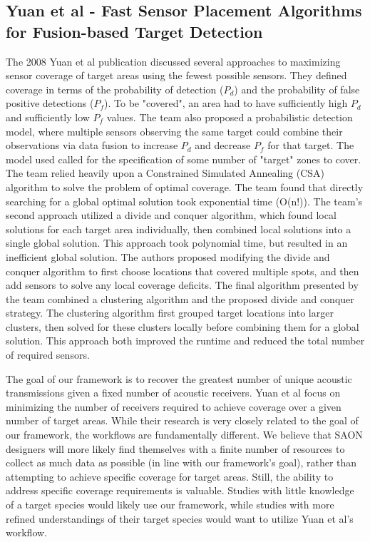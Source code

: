 \subsection{Yuan et al - Fast Sensor Placement Algorithms for Fusion-based Target Detection}
The 2008 Yuan et al publication discussed several approaches to maximizing sensor coverage of target areas using the fewest possible sensors.  They defined coverage in terms of the probability of detection ($P_d$) and the probability of false positive detections ($P_f$).  To be "covered", an area had to have sufficiently high $P_d$ and sufficiently low $P_f$ values.  The team also proposed a probabilistic detection model, where multiple sensors observing the same target could combine their observations via  data fusion to increase $P_d$ and decrease $P_f$ for that target. The model used called for the specification of some number of "target" zones to cover.  The team relied heavily upon a Constrained Simulated Annealing (CSA) algorithm to solve the problem of optimal coverage.  The team found that directly searching for a global optimal solution took exponential time (O(n!)).  The team's second approach utilized a divide and conquer algorithm, which found local solutions for each target area individually, then combined local solutions into a single global solution.  This approach took polynomial time, but resulted in an inefficient global solution.  The authors proposed modifying the divide and conquer algorithm to first choose locations that covered multiple spots, and then add sensors to solve any local coverage deficits.  The final algorithm presented by the team combined a clustering algorithm and the proposed divide and conquer strategy.  The clustering algorithm first grouped target locations into larger clusters, then solved for these clusters locally before combining them for a global solution.  This approach both improved the runtime and reduced the total number of required sensors.

The goal of our framework is to recover the greatest number of unique acoustic transmissions given a fixed number of acoustic receivers.  Yuan et al focus on minimizing the number of receivers required to achieve coverage over a given number of target areas.  While their research is very closely related to the goal of our framework, the workflows are fundamentally different.  We believe that SAON designers will more likely find themselves with a finite number of resources to collect as much data as possible (in line with our framework's goal), rather than attempting to achieve specific coverage for target areas.  Still, the ability to address specific coverage requirements is valuable.  Studies with little knowledge of a target species would likely use our framework, while studies with more refined understandings of their target species would want to utilize Yuan et al's workflow.  



